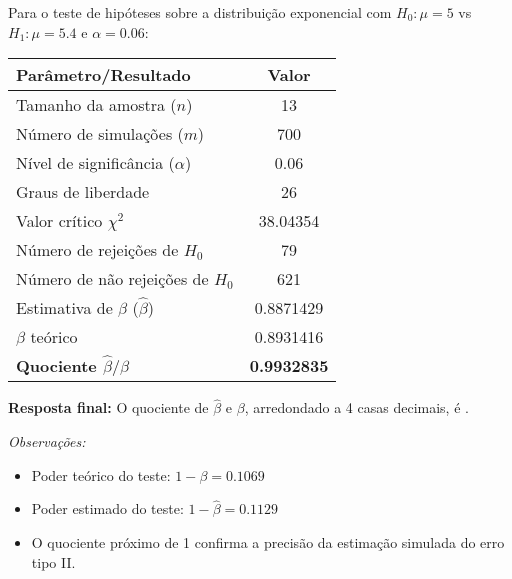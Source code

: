 \documentclass[11pt,a4paper]{article}
\begin{document}
\begin{tcolorbox}[colback=green!5!white,colframe=green!75!black,title=Solução]
Para o teste de hipóteses sobre a distribuição exponencial com \( H_0: \mu = 5 \) vs \( H_1: \mu = 5.4 \) e \( \alpha = 0.06 \):

\begin{center}
\begin{tabular}{|l|c|}
\hline
\textbf{Parâmetro/Resultado} & \textbf{Valor} \\
\hline
Tamanho da amostra (\( n \)) & 13 \\
Número de simulações (\( m \)) & 700 \\
Nível de significância (\( \alpha \)) & 0.06 \\
Graus de liberdade & 26 \\
Valor crítico \( \chi^2 \) & 38.04354 \\
\hline
Número de rejeições de \( H_0 \) & 79 \\
Número de não rejeições de \( H_0 \) & 621 \\
\hline
Estimativa de \( \beta \) (\( \hat{\beta} \)) & 0.8871429 \\
\( \beta \) teórico & 0.8931416 \\
\hline
\textbf{Quociente \( \hat{\beta} / \beta \)} & \textbf{0.9932835} \\
\hline
\end{tabular}
\end{center}

\vspace{0.5cm}
\textbf{Resposta final:} O quociente de \( \hat{\beta} \) e \( \beta \), arredondado a 4 casas decimais, é .

\vspace{0.3cm}
\textit{Observações:}
\begin{itemize}
    \item Poder teórico do teste: \( 1 - \beta = 0.1069 \)
    \item Poder estimado do teste: \( 1 - \hat{\beta} = 0.1129 \)
    \item O quociente próximo de 1 confirma a precisão da estimação simulada do erro tipo II.
\end{itemize}
\end{tcolorbox}
\end{document}
